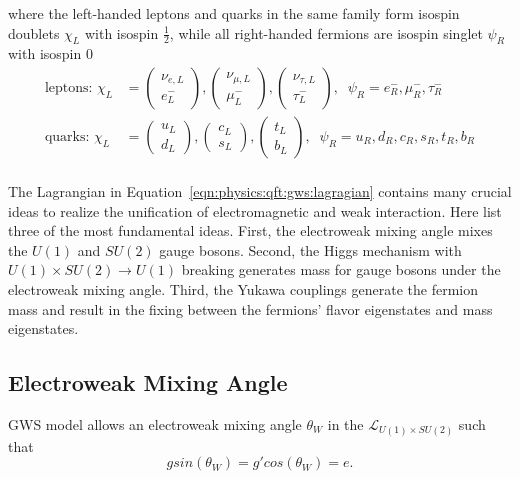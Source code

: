 \noindent where the left-handed leptons and quarks in the same family form isospin doublets $\chi_L$  with isospin $\frac{1}{2}$, while all right-handed fermions are isospin singlet $\psi_R$ with isospin 0
\begin{equation}
\begin{split}
    \text{leptons: }
    \chi_L &= 
    \begin{pmatrix} \nu_{e,L} \\ e^-_{L} \end{pmatrix}, 
    \begin{pmatrix} \nu_{\mu,L} \\ \mu^-_{L} \end{pmatrix},
    \begin{pmatrix} \nu_{\tau,L} \\ \tau^-_{L} \end{pmatrix}, 
    \;\; \psi_R  = e^-_R, \mu^-_R, \tau^-_R \\
    \text{quarks: }
    \chi_L &= 
    \begin{pmatrix} u_{L} \\ d_{L} \end{pmatrix}, 
    \begin{pmatrix} c_{L} \\ s_{L} \end{pmatrix},
    \begin{pmatrix} t_{L} \\ b_{L} \end{pmatrix}, 
    \;\; \psi_R = u_R, d_R, c_R, s_R, t_R, b_R \\
\end{split}
\end{equation}

\noindent The Lagrangian in Equation~\ref{eqn:physics:qft:gws:lagragian} contains many crucial ideas to realize the unification of electromagnetic and weak interaction. Here list three of the most fundamental ideas. First, the electroweak mixing angle mixes the $U(1)$ and $SU(2)$ gauge bosons. Second, the Higgs mechanism with $U(1)\times SU(2)\to U(1)$ breaking generates mass for gauge bosons under the electroweak mixing angle. Third, the Yukawa couplings generate the fermion mass and result in the fixing between the fermions' flavor eigenstates and mass eigenstates.


\subsection{Electroweak Mixing Angle}
GWS model allows an electroweak mixing angle $\theta_W$  in the $\mathcal{L}_{U(1)\times SU(2)}$ such that 
\begin{equation}
    g sin(\theta_W) = g' cos(\theta_W) = e.
\end{equation}

